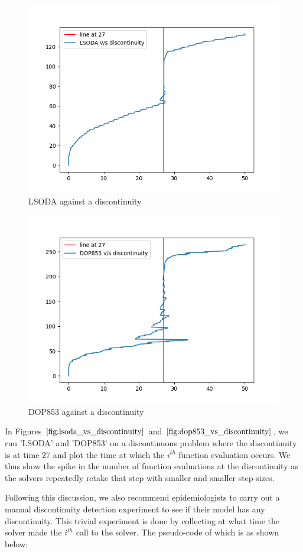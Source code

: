 \begin{figure}[h]
	\centering
	\includegraphics[width=0.7\linewidth]{./figures/lsoda_vs_discontinuity}
	\caption{LSODA against a discontinuity}
	\label{fig:lsoda_vs_discontinuity}
\end{figure}

\begin{figure}[h]
	\centering
	\includegraphics[width=0.7\linewidth]{./figures/dop853_vs_discontinuity}
	\caption{DOP853 against a discontinuity}
	\label{fig:dop853_vs_discontinuity}
\end{figure}

In Figures $\ref{fig:lsoda_vs_discontinuity}$ and $\ref{fig:dop853_vs_discontinuity}$, we run 'LSODA' and 'DOP853' on a discontinuous problem where the discontinuity is at time 27 and plot the time at which the $i^{th}$ function evaluation occurs. We thus show the spike in the number of function evaluations at the discontinuity as the solvers repeatedly retake that step with smaller and smaller step-sizes.

Following this discussion, we also recommend epidemiologists to carry out a manual discontinuity detection experiment to see if their model has any discontinuity. This trivial experiment is done by collecting at what time the solver made the $i^{th}$ call to the solver. The pseudo-code of which is as shown below:

